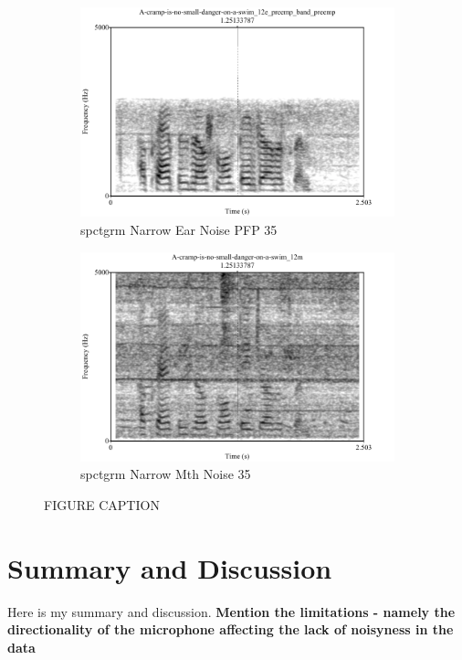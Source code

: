 \documentclass[dissertation,copyright]{uathesis}
\begin{document}
\begin{figure}
\centering
\begin{subfigure}{0.5\textwidth}
  \centering
  \includegraphics[width=1\linewidth]{figure/spctgrmNarrowEarNoisePrempFiltPremp.pdf}
  \caption{spctgrm Narrow Ear Noise PFP 35}
  \label{spctgrmNarrowEarNoisePrempFiltPremp_35}
\end{subfigure}%
\hfill
\begin{subfigure}{0.5\textwidth}
  \centering
  \includegraphics[width=1\linewidth]{figure/spctgrmNarrowMthNoise_35.pdf}
  \caption{spctgrm Narrow Mth Noise 35}
  \label{spctgrmNarrowMouthNoise_35_compare}
\end{subfigure}
\caption{FIGURE CAPTION}
\label{fig:ear_pfp}
\end{figure}

\section{Summary and Discussion}
Here is my summary and discussion. \textbf{Mention the limitations - namely the directionality of the microphone affecting the lack of noisyness in the data}









\end{document}
